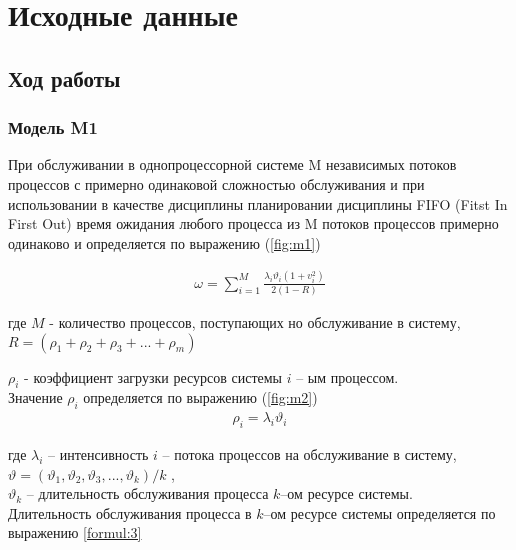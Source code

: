 \section*{Исходные данные}






\subsection*{Ход работы}

\subsubsection*{Модель M1}

При обслуживании в однопроцессорной системе M независимых потоков процессов с примерно одинаковой сложностью обслуживания и при использовании в качестве дисциплины планировании дисциплины FIFO (Fitst In First Out) время ожидания любого процесса из M потоков процессов примерно одинаково и определяется по выражению (\ref{fig:m1})

\begin{align}
	\omega = \sum_{i=1}^{M}\frac{\lambda_i\vartheta_i(1+v^2_i)}{2(1-R)}
	\label{fig:m1}
\end{align}


где $M$ - количество процессов, поступающих но обслуживание в систему, \\
$R = (\rho_1 + \rho_2 + \rho_3 + ... +\rho_m)$

$\rho_i$ - коэффициент загрузки ресурсов системы $i$ -- ым процессом. \\
Значение $\rho_i$ определяется по выражению (\ref{fig:m2})\\

\begin{align}
	\rho_i = \lambda_i\vartheta_i 
	\label{fig:m2}
\end{align}

где $\lambda_i$ -- интенсивность $i$ -- потока процессов на обслуживание в систему, \\
$\vartheta = (\vartheta_1,\vartheta_2,\vartheta_3,...,\vartheta_k) / k$ , \\
$\vartheta_k$ -- длительность обслуживания процесса $k$--ом ресурсе системы. \\
Длительность обслуживания процесса в $k$--ом ресурсе системы определяется по выражению \ref{formul:3}

